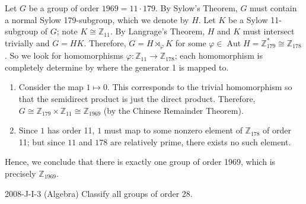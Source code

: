 \documentclass{article}
\begin{document}
\begin{solutions}
	Let $G$ be a group of order $1969 = 11 \cdot 179$. By Sylow's Theorem, $G$ must contain a normal Sylow 179-subgroup, which we denote by $H$. Let $K$ be a Sylow 11-subgroup of $G$; note $K \cong \mathbb{Z}_{11}$. By Langrage's Theorem, $H$ and $K$ must intersect trivially and $G = HK$. Therefore, $G = H \rtimes_{\varphi} K$ for some $\varphi \in \operatorname{Aut}{H} = \mathbb{Z}_{179}^{\ast}\cong \mathbb{Z}_{178}$. So we look for homomorphisms $\varphi: \mathbb{Z}_{11} \to \mathbb{Z}_{178}$; each homomorphism is completely determine by where the generator 1 is mapped to. \vspace{-0.35cm}
		\begin{enumerate}[itemsep =-2pt,label= (\roman{*})]
			\item Consider the map $1 \mapsto 0$. This corresponds to the trivial homomorphism so that the semidirect product is just the direct product. Therefore, $G \cong \mathbb{Z}_{179} \times \mathbb{Z}_{11} \cong \mathbb{Z}_{1969}$ (by the Chinese Remainder Theorem). 
			\item Since $1$ has order 11, $1$ must map to some nonzero element of $\mathbb{Z}_{178}$ of order 11; but since $11$ and $178$ are relatively prime, there exists no such element. 
		\end{enumerate}
	Hence, we conclude that there is exactly one group of order 1969, which is precisely $\mathbb{Z}_{1969}$. 
\end{solutions}
\begin{prb}{2008-J-I-3 (Algebra)}
	Classify all groups of order 28. 
\end{prb}
\end{document}
